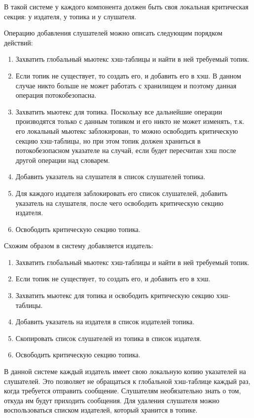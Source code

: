В такой системе у каждого компонента должен быть своя локальная критическая секция: у издателя, у топика и у слушателя.

Операцию добавления слушателей можно описать следующим порядком действий:

\begin{enumerate}
	\item Захватить глобальный мьютекс хэш-таблицы и найти в ней требуемый топик.
	\item Если топик не существует, то создать его, и добавить его в хэш. В данном случае никто больше не может работать с хранилищем и поэтому данная операция потокобезопасна.
	\item Захватить мьютекс для топика. Поскольку все дальнейшие операции производятся только с данным топиком и его никто не может изменять, т.к. его локальный мьютекс заблокирован, то можно освободить критическую секцию хэш-таблицы, но при этом топик должен храниться в потокобезопасном указателе на случай, если будет пересчитан хэш после другой операции над словарем.
	\item Добавить указатель на слушателя в список слушателей топика.
	\item Для каждого издателя заблокировать его список слушателей, добавить указатель на слушателя, после чего освободить критическую секцию издателя.
	\item Освободить критическую секцию топика.
\end{enumerate}

Схожим образом в систему добавляется издатель:

\begin{enumerate}
	\item Захватить глобальный мьютекс хэш-таблицы и найти в ней требуемый топик.
	\item Если топик не существует, то создать его, и добавить его в хэш.
	\item Захватить мьютекс для топика и освободить критическую секцию хэш-таблицы.
	\item Добавить указатель на издателя в список издателей топика.
	\item Скопировать список слушателей из топика в список издателя.
	\item Освободить критическую секцию топика.
\end{enumerate}

В данной системе каждый издатель имеет свою локальную копию указателей на слушателей. Это позволяет не обращаться к глобальной хэш-таблице каждый раз, когда требуется отправить сообщение. Слушателям необязательно знать о том, откуда им будут приходить сообщения. Для удаления слушателя можно воспользоваться списком издателей, который хранится в топике.

